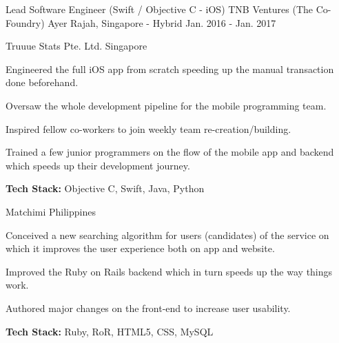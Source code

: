 \begin{cventries}
    \cventry
        {Lead Software Engineer (Swift / Objective C - iOS)}
        {TNB Ventures (The Co-Foundry)}
        {Ayer Rajah, Singapore - Hybrid}
        {Jan. 2016 - Jan. 2017}
        {
            \begin{cvitems}
                \item
                    {Truuue Stats Pte. Ltd. Singapore}
                \begin{cvsubitems}
                    \item
                        {Engineered the full iOS app from scratch speeding up the manual transaction done beforehand.}
                    \item
                        {Oversaw the whole development pipeline for the mobile programming team.}
                    \item
                        {Inspired fellow co-workers to join weekly team re-creation/building.}
                    \item
                        {Trained a few junior programmers on the flow of the mobile app and backend which speeds up their development journey.}
                    \item                        
                        {\textbf{Tech Stack:} Objective C, Swift, Java, Python}                     
                \end{cvsubitems}
                \item 
                    {Matchimi Philippines}
                \begin{cvsubitems}
                    \item 
                        {Conceived a new searching algorithm for users (candidates) of the service on which it improves the user experience both on app and website.}
                    \item
                        {Improved the Ruby on Rails backend which in turn speeds up the way things work.}
                    \item 
                        {Authored major changes on the front-end to increase user usability.}
                    \item 
                        {\textbf{Tech Stack:} Ruby, RoR, HTML5, CSS, MySQL}
                \end{cvsubitems}
            \end{cvitems}        
        }
        

\end{cventries}
